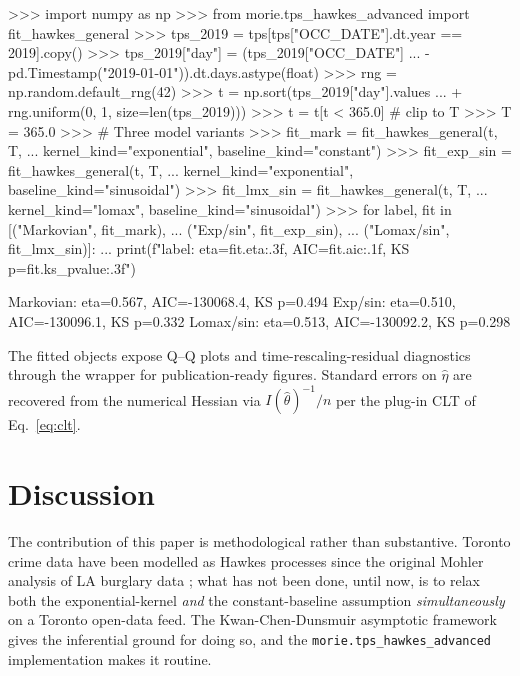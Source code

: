 \documentclass[article,shortnames,nojss]{jss}
\newcommand{\1}{\mathbbm{1}}
\theoremstyle{plain}
\theoremstyle{definition}
\begin{document}
\begin{CodeChunk}
\begin{CodeInput}
>>> import numpy as np
>>> from morie.tps_hawkes_advanced import fit_hawkes_general
>>> tps_2019 = tps[tps["OCC_DATE"].dt.year == 2019].copy()
>>> tps_2019["day"] = (tps_2019["OCC_DATE"]
...                    - pd.Timestamp("2019-01-01")).dt.days.astype(float)
>>> rng = np.random.default_rng(42)
>>> t = np.sort(tps_2019["day"].values
...              + rng.uniform(0, 1, size=len(tps_2019)))
>>> t = t[t < 365.0]   # clip to T
>>> T = 365.0
>>> # Three model variants
>>> fit_mark = fit_hawkes_general(t, T,
...     kernel_kind="exponential", baseline_kind="constant")
>>> fit_exp_sin = fit_hawkes_general(t, T,
...     kernel_kind="exponential", baseline_kind="sinusoidal")
>>> fit_lmx_sin = fit_hawkes_general(t, T,
...     kernel_kind="lomax", baseline_kind="sinusoidal")
>>> for label, fit in [("Markovian", fit_mark),
...                     ("Exp/sin",   fit_exp_sin),
...                     ("Lomax/sin", fit_lmx_sin)]:
...     print(f"{label}: eta={fit.eta:.3f}, AIC={fit.aic:.1f}, KS p={fit.ks_pvalue:.3f}")
\end{CodeInput}
\begin{CodeOutput}
Markovian: eta=0.567, AIC=-130068.4, KS p=0.494
Exp/sin:   eta=0.510, AIC=-130096.1, KS p=0.332
Lomax/sin: eta=0.513, AIC=-130092.2, KS p=0.298
\end{CodeOutput}
\end{CodeChunk}

The fitted objects expose Q--Q plots and time-rescaling-residual
diagnostics through the  wrapper for
publication-ready figures.  Standard errors on $\hat\eta$ are
recovered from the numerical Hessian via $I(\hat\theta)^{-1}/n$
per the plug-in CLT of Eq.~\ref{eq:clt}.

\section{Discussion}\label{sec:discussion}

The contribution of this paper is methodological rather than
substantive.  Toronto crime data have been modelled as Hawkes
processes since the original Mohler analysis of LA burglary data
\citep{Mohler2011}; what has not been done, until now, is to
relax both the exponential-kernel \emph{and} the constant-baseline
assumption \emph{simultaneously} on a Toronto open-data feed.  The
Kwan-Chen-Dunsmuir asymptotic framework gives the inferential
ground for doing so, and the \texttt{morie.tps\_hawkes\_advanced}
implementation makes it routine.
\end{document}
